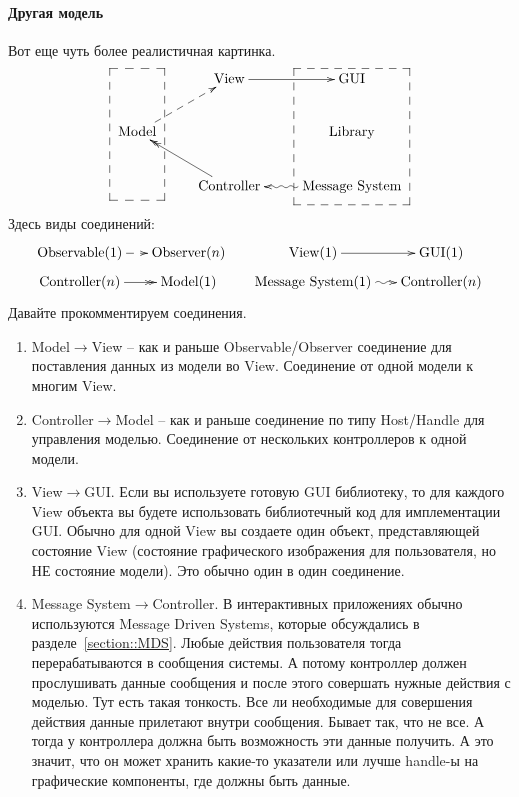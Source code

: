 \paragraph{Другая модель}

Вот еще чуть более реалистичная картинка.
\[
\xymatrix{
  {\phantom{\text{Model}}}
  {\save
  [].[dd]*+[F--]\frm{}
  \restore
  }  
  &{\text{View}}\ar[r]&{\text{GUI}}
  {\save
  [].[dd]*+[F--]\frm{}
  \restore
  }\\
  {\text{Model}}\ar@{-->}[ru]&{}&{\text{Library}}\\
  {}&{\text{Controller}}\ar@{->>}[lu]&{\text{Message System}}\ar@{~>}[l]\\
}
\]
Здесь виды соединений:
\[
\xymatrix@R=5pt@C=15pt{
  {\text{Observable}(1)}\ar@{-->}[r]&{\text{Observer}(n)}&  {\text{View}(1)}\ar@{->}[r]&{\text{GUI}(1)}\\
  {\text{Controller}(n)}\ar@{->>}[r]&{\text{Model}(1)}&  {\text{Message System}(1)}\ar@{~>}[r]&{\text{Controller}(n)}\\
}
\]
Давайте прокомментируем соединения.
\begin{enumerate}
\item Model$\to$View -- как и раньше Observable/Observer соединение для поставления данных из модели во View.
Соединение от одной модели к многим View.

\item Controller$\to$Model -- как и раньше соединение по типу Host/Handle для управления моделью.
Соединение от нескольких контроллеров к одной модели.

\item View$\to$GUI.
Если вы используете готовую GUI библиотеку, то для каждого View объекта вы будете использовать библиотечный код для имплементации GUI.
Обычно для одной View вы создаете один объект, представляющей состояние View (состояние графического изображения для пользователя, но НЕ состояние модели).
Это обычно один в один соединение.

\item Message System$\to$Controller.
В интерактивных приложениях обычно используются Message Driven Systems, которые обсуждались в разделе~\ref{section::MDS}.
Любые действия пользователя тогда перерабатываются в сообщения системы.
А потому контроллер должен прослушивать данные сообщения и после этого совершать нужные действия с моделью.
Тут есть такая тонкость.
Все ли необходимые для совершения действия данные прилетают внутри сообщения.
Бывает так, что не все.
А тогда у контроллера должна быть возможность эти данные получить.
А это значит, что он может хранить какие-то указатели или лучше handle-ы на графические компоненты, где должны быть данные.
\end{enumerate}

